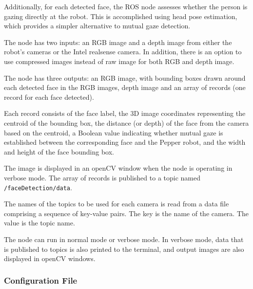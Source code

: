 \documentclass{CSSRforAfrica}
\begin{document}
Additionally, for each detected face, the ROS node assesses whether the person is gazing directly at the robot. This is accomplished using head pose estimation, which provides a simpler alternative to mutual gaze detection.

The node has two inputs: an RGB image and a depth image from either the robot’s cameras or the Intel realsense camera. In addition, there is an option to use compressed images instead of raw image for both RGB and depth image.

The node has three outputs: an RGB image, with bounding boxes drawn around each detected face in the RGB images, depth image and an array of  records (one record for each face detected).  

Each record consists of the face label, the 3D image coordinates representing the centroid of the bounding box, the distance (or depth) of the face from the camera based on the centroid, a Boolean value indicating whether mutual gaze is established between the corresponding face and the Pepper robot, and the width and height of the face bounding box.

The image is displayed in an openCV window when the node is operating in verbose mode.  The array of records is  published to a  topic named {\small \verb+/faceDetection/data+}.
 
The names of the topics to be used for each camera is read from a data file comprising a sequence of key-value pairs. The key is the name of the camera. The value is the topic name.    

The node can run in normal mode or verbose mode. In verbose mode, data that is published to topics is also printed to the terminal, and output images are also displayed in openCV windows.

\newpage

\subsubsection*{Configuration File}
\end{document}
